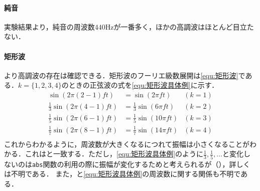 \paragraph{純音}実験結果より，純音の周波数\(440\textrm{Hz}\)が一番多く，ほかの高調波はほとんど目立たない．
\paragraph{矩形波}より高調波の存在は確認できる．矩形波のフーリエ級数展開は\eqref{equ:矩形波}である．\(k=\{1,2,3,4\}\)のときの正弦波の式を\eqref{equ:矩形波具体例}に示す．
\begin{equation}
    \begin{aligned}
        \sin(2\pi(2-1)ft)            & =\sin(2\pi ft)             & (k=1) \\
        \frac{1}{3}\sin(2\pi(4-1)ft) & =\frac{1}{3}\sin(6\pi ft)  & (k=2) \\
        \frac{1}{5}\sin(2\pi(6-1)ft) & =\frac{1}{5}\sin(10\pi ft) & (k=3) \\
        \frac{1}{7}\sin(2\pi(8-1)ft) & =\frac{1}{7}\sin(14\pi ft) & (k=4) \\
    \end{aligned}\label{equ:矩形波具体例}
\end{equation}
これからわかるように，周波数が大きくなるにつれて振幅は小さくなることがわかる．これはと一致する．ただし，\eqref{equ:矩形波具体例}のように\(\frac{1}{3}, \frac{1}{5},\dots\)と変化しないのは\texttt{abs}関数の利用の際に振幅が変化するためと考えられるが（），詳しくは不明である．
また，と\eqref{equ:矩形波具体例}の周波数に関する関係も不明である．
